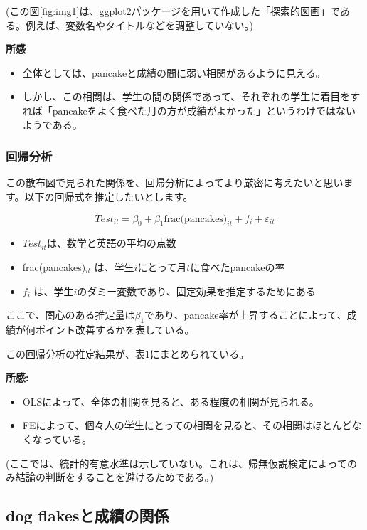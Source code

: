 \documentclass[xelatex,ja=standard]{bxjsarticle}
\begin{document}
(この図\ref{fig:img1}は、ggplot2パッケージを用いて作成した「探索的図画」である。例えば、変数名やタイトルなどを調整していない。)

\textbf{所感}
\begin{itemize}
\item 全体としては、pancakeと成績の間に弱い相関があるように見える。
\item しかし、この相関は、学生の間の関係であって、それぞれの学生に着目をすれば「pancakeをよく食べた月の方が成績がよかった」というわけではないようである。
\end{itemize}

\subsubsection{回帰分析}
この散布図で見られた関係を、回帰分析によってより厳密に考えたいと思います。以下の回帰式を推定したいとします。

\begin{equation}
Test_{it} = \beta_0 + \beta_{1} \text{frac(pancakes)}_{it} + f_{i} + \varepsilon_{it}

\end{equation}

\begin{itemize}
\item $Test_{it}$は、数学と英語の平均の点数
\item frac(pancakes)$_{it}$ は、学生$i$にとって月$t$に食べたpancakeの率
\item $f_i$ は、学生$i$のダミー変数であり、固定効果を推定するためにある
\end{itemize}

ここで、関心のある推定量は$\beta_{1}$であり、pancake率が上昇することによって、成績が何ポイント改善するかを表している。



この回帰分析の推定結果が、表1にまとめられている。

\textbf{所感:}
\begin{itemize}
\item OLSによって、全体の相関を見ると、ある程度の相関が見られる。
\item FEによって、個々人の学生にとっての相関を見ると、その相関はほとんどなくなっている。
\end{itemize}

(ここでは、統計的有意水準は示していない。これは、帰無仮説検定によってのみ結論の判断をすることを避けるためである。)

\subsection{dog flakesと成績の関係}



 

%
\end{document}

